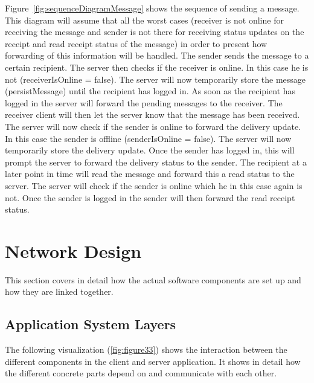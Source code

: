 Figure~\ref{fig:sequenceDiagramMessage} shows the sequence of sending a message.
This diagram will assume that all the worst cases (receiver is not online for receiving the message and sender is not
there for receiving status updates on the receipt and read receipt status of the message) in order to present how
forwarding of this information will be handled.
The sender sends the message to a certain recipient.
The server then checks if the receiver is online.
In this case he is not (receiverIsOnline = false).
The server will now temporarily store the message (persistMessage) until the recipient has logged in.
As soon as the recipient has logged in the server will forward the pending messages to the receiver.
The receiver client will then let the server know that the message has been received.
The server will now check if the sender is online to forward the delivery update.
In this case the sender is offline (senderIsOnline = false).
The server will now temporarily store the delivery update.
Once the sender has logged in, this will prompt the server to forward the delivery status to the sender.
The recipient at a later point in time will read the message and forward this a read status to the server.
The server will check if the sender is online which he in this case again is not.
Once the sender is logged in the sender will then forward the read receipt status.


\section{Network Design}\label{sec:network-design}

This section covers in detail how the actual software components are set up and how they are linked together.

\subsection{Application System Layers}\label{subsec:application-system-layers}

The following visualization (\ref{fig:figure33}) shows the interaction between the different components in the client
and server application.
It shows in detail how the different concrete parts depend on and communicate with each other.


